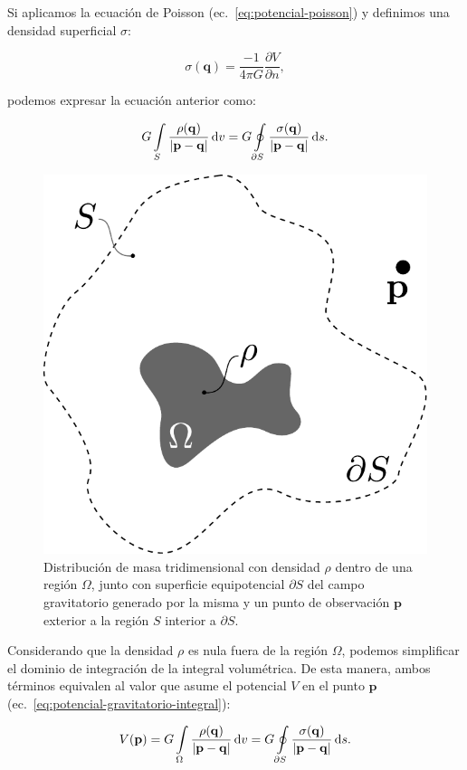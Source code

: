 Si aplicamos la ecuación de Poisson (ec.~\ref{eq:potencial-poisson})
y definimos una densidad superficial $\sigma$:

\begin{equation}
    \sigma(\mathbf{q}) =
    \frac{-1}{4\pi G} \frac{\partial V}{\partial n},
\end{equation}

\noindent podemos expresar la ecuación anterior como:

\begin{equation}
    G \int\limits_S
        \frac{\rho(\mathbf{q})}{|\mathbf{p} - \mathbf{q}|}
    \mathop{}\!\textnormal{d} v
    =
    G \oint\limits_{\partial S}
        \frac{\sigma(\mathbf{q})}{|\mathbf{p} - \mathbf{q}|}
    \mathop{}\!\textnormal{d} s.
\end{equation}

\begin{figure}[t]
    \centering
    \includegraphics[width=0.4\linewidth]{figs/fuentes-equivalentes.pdf}
    \caption{
        Distribución de masa tridimensional con densidad $\rho$ dentro de una
        región $\Omega$, junto con superficie equipotencial $\partial S$ del
        campo gravitatorio generado por la misma y un punto de observación
        $\mathbf{p}$ exterior a la región $S$ interior a $\partial S$.
    }
    \label{fig:fuentes-equivalentes}
\end{figure}

Considerando que la densidad $\rho$ es nula fuera de la región $\Omega$,
podemos simplificar el dominio de integración de la integral volumétrica.
De esta manera, ambos términos equivalen al valor que asume el potencial $V$ en
el punto $\mathbf{p}$ (ec.~\ref{eq:potencial-gravitatorio-integral}):

\begin{equation}
    V(\mathbf{p}) =
    G \int\limits_\Omega
        \frac{\rho(\mathbf{q})}{|\mathbf{p} - \mathbf{q}|}
    \mathop{}\!\textnormal{d} v
    =
    G \oint\limits_{\partial S}
        \frac{\sigma(\mathbf{q})}{|\mathbf{p} - \mathbf{q}|}
    \mathop{}\!\textnormal{d} s.
\end{equation}


